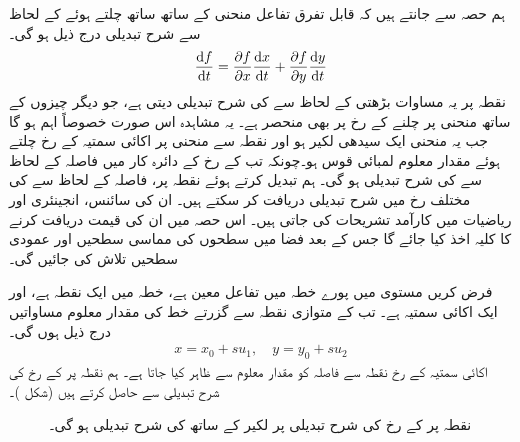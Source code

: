 
ہم حصہ  سے جانتے ہیں کہ قابل تفرق تفاعل   منحنی  کے ساتھ ساتھ چلتے ہوئے   کے لحاظ سے شرح تبدیلی درج ذیل ہو گی۔
\begin{align*}
\frac{\dif f}{\dif t}=\frac{\partial f}{\partial x}\frac{\dif x}{\dif t}+\frac{\partial f}{\partial y}\frac{\dif y}{\dif t}
\end{align*} 
نقطہ   پر یہ مساوات بڑھتی  کے لحاظ سے  کی شرح تبدیلی دیتی ہے،  جو دیگر  چیزوں کے ساتھ  منحنی پر چلنے کے رخ پر بھی منحصر ہے۔ یہ  مشاہدہ   اس صورت خصوصاً     اہم  ہو  گا  جب یہ    منحنی ایک سیدھی  لکیر ہو  اور نقطہ   سے منحنی پر اکائی سمتیہ  کے رخ  چلتے ہوئے  مقدار معلوم لمبائی قوس     ہو۔چونکہ تب   کے رخ  کے دائرہ کار میں  فاصلہ کے لحاظ  سے    کی شرح تبدیلی   ہو گی۔ ہم      تبدیل کرتے ہوئے نقطہ  پر،     فاصلہ کے لحاظ سے  کی مختلف رخ میں  شرح تبدیلی    دریافت کر سکتے ہیں۔   ان   کی  سائنس،  انجینئری اور ریاضیات   میں کارآمد  تشریحات  کی جاتی ہیں۔ اس حصہ میں ان کی قیمت دریافت کرنے کا کلیہ اخذ کیا جائے گا جس کے بعد فضا میں سطحوں کی مماسی سطحیں اور عمودی سطحیں تلاش کی جائیں گی۔

فرض کریں  مستوی  میں پورے خطہ  میں  تفاعل  معین ہے،  خطہ  میں ایک نقطہ ہے، اور  ایک اکائی سمتیہ ہے۔  تب  کے متوازی نقطہ   سے گزرتے  خط کی مقدار معلوم مساواتیں درج ذیل ہوں گی۔
\begin{align*}
x=x_0+su_1,\quad y=y_0+su_2
\end{align*}
 اکائی سمتیہ  کے رخ  نقطہ  سے فاصلہ  کو مقدار معلوم سے ظاہر کیا جاتا ہے۔ ہم نقطہ  پر  کے رخ  کی شرح تبدیلی     سے حاصل کرتے ہیں (شکل )۔
\begin{figure}
\centering
{}
\caption{نقطہ  پر  کے رخ  کی شرح تبدیلی   پر لکیر کے ساتھ  کی شرح تبدیلی ہو گی۔}
\label{شکل_کثیرالمتغیر_کسی_رخ_بڑھنے_کی_شرح}
\end{figure}

